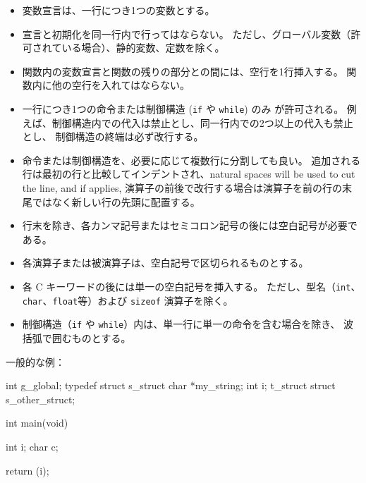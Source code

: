 \documentclass{42-ja}
\begin{document}
\begin{itemize}
            \item 変数宣言は、一行につき1つの変数とする。

            \item 宣言と初期化を同一行内で行ってはならない。
              ただし、グローバル変数（許可されている場合）、静的変数、定数を除く。

            \item 関数内の変数宣言と関数の残りの部分との間には、空行を1行挿入する。
              関数内に他の空行を入れてはならない。

            \item 一行につき1つの命令または制御構造 (\texttt{if} や \texttt{while}) のみ
              が許可される。
              例えば、制御構造内での代入は禁止とし、同一行内での2つ以上の代入も禁止とし、
              制御構造の終端は必ず改行する。

            \item 命令または制御構造を、必要に応じて複数行に分割しても良い。
              追加される行は最初の行と比較してインデントされ、natural spaces will be used to cut the line, and if applies,
              演算子の前後で改行する場合は演算子を前の行の末尾ではなく新しい行の先頭に配置する。

            \item 行末を除き、各カンマ記号またはセミコロン記号の後には空白記号が必要である。

            \item 各演算子または被演算子は、空白記号で区切られるものとする。

            \item 各 C キーワードの後には単一の空白記号を挿入する。
              ただし、型名（\texttt{int}、\texttt{char}、\texttt{float}等）および \texttt{sizeof} 演算子を除く。

            \item 制御構造（\texttt{if} や \texttt{while}）内は、単一行に単一の命令を含む場合を除き、
              波括弧で囲むものとする。

            \end{itemize}

\vspace{1cm}

            一般的な例：
            \begin{42ccode}
int             g_global;
typedef struct  s_struct
{
    char    *my_string;
    int     i;
}               t_struct
struct          s_other_struct;

int     main(void)
{
    int     i;
    char    c;

    return (i);
}
            \end{42ccode}
            \newpage
\end{document}
